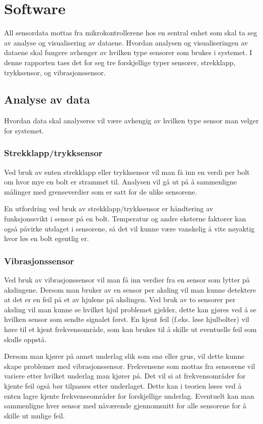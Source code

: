 \section{Software}
All sensordata mottas fra mikrokontrollerene hos en sentral enhet som skal ta seg 
av analyse og visualisering av dataene. Hvordan analysen og visualiseringen av 
dataene skal fungere avhenger av hvilken type sensorer som brukes i systemet. I 
denne rapporten taes det for seg tre forskjellige typer sensorer, strekklapp, 
trykksensor, og vibrasjonssensor.

\subsection{Analyse av data}
Hvordan data skal analyseres vil være avhengig av hvilken type sensor man velger 
for systemet. 

\subsubsection{Strekklapp/trykksensor}
Ved bruk av enten strekklapp eller trykksensor vil man få inn en verdi per bolt 
om hvor mye en bolt er strammet til. Analysen vil gå ut på å sammenligne målinger 
med grenseverdier som er satt for de ulike sensorene.

En utfordring ved bruk av strekklapp/trykksensor er håndtering av 
funksjonssvikt i sensor på en bolt. Temperatur og andre eksterne faktorer kan 
også påvirke utslaget i sensorene, så det vil kunne være vanskelig å vite 
nøyaktig hvor løs en bolt egentlig er.

\subsubsection{Vibrasjonssensor}
Ved bruk av vibrasjonssensor vil man få inn verdier fra en sensor som lytter på 
akslingene. Dersom man bruker av en sensor per aksling vil man kunne detektere at 
det er en feil på et av hjulene på akslingen. Ved bruk av to sensorer per aksling 
vil man kunne se hvilket hjul problemet gjelder, dette kan gjøres ved å se 
hvilken sensor som sendte signalet først. En kjent feil (f.eks. løse hjulbolter) vil 
høre til et kjent frekvensområde, som kan brukes til å skille ut eventuelle 
feil som skulle oppstå.

Dersom man kjører på annet underlag slik som snø eller grus, vil dette kunne 
skape problemer med vibrasjonssensor. Frekvensene som mottas fra sensorene vil 
variere etter hvilket underlag man kjører på. Det vil si at frekvensområder for 
kjente feil også bør tilpasses etter underlaget. Dette kan i teorien løses ved å 
enten lagre kjente frekvenseområder for forskjellige underlag. Eventuelt kan man 
sammenligne hver sensor med nåværende gjennomsnitt for alle sensorene for å 
skille ut mulige feil. 

